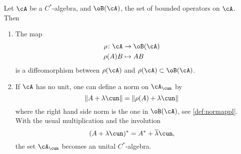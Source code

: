 \begin{lemma}
Let $\cA$ be a $C^*$-algebra, and $\oB(\cA)$, the set of bounded operators on $\cA$. Then

\begin{enumerate}
\item The map 
        \begin{equation}
        \begin{aligned}
            \rho \colon \cA &\to \oB(\cA)\\
            \rho(A)B&\mapsto AB
        \end{aligned}
    \end{equation}  
is a diffeomorphism between $\rho(\cA)$ and $\rho(\cA)\subset\oB(\cA)$.

\item If $\cA$ has no unit, one can define a norm on $\cA_{\cun}$ by
\begin{equation} \label{eq:normCAu}
\|A+\lambda\cun\|=\|\rho(A)+\lambda\cun\|
\end{equation}
where the right hand side norm is the one in $\oB(\cA)$, see \ref{def:normappl}. With the usual multiplication and the involution
\begin{equation}
  (A+\lambda\cun)^*=A^*+ \overline{\lambda} \cun,
\end{equation}
the set $\cA_{\cun}$ becomes an unital $C^*$-algebra.

\end{enumerate}
 \label{lem:unitariz_C}
\end{lemma}

